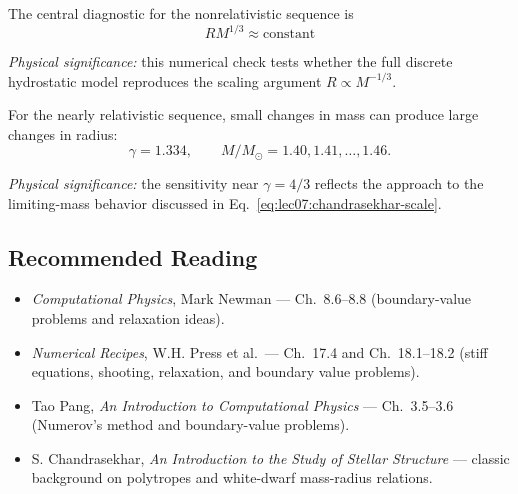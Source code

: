 The central diagnostic for the nonrelativistic sequence is
\begin{equation}
    \boxed{
    RM^{1/3}\approx \text{constant}}
    \label{eq:lec07:nonrel-diagnostic}
\end{equation}

\textit{Physical significance:} this numerical check tests whether the full
discrete hydrostatic model reproduces the scaling argument
$R\propto M^{-1/3}$.

For the nearly relativistic sequence, small changes in mass can produce
large changes in radius:
\begin{equation}
    \gamma=1.334,
    \qquad
    M/M_\odot=1.40,1.41,\ldots,1.46.
    \label{eq:lec07:near-relativistic-sequence}
\end{equation}

\textit{Physical significance:} the sensitivity near $\gamma=4/3$ reflects
the approach to the limiting-mass behavior discussed in
Eq.~\eqref{eq:lec07:chandrasekhar-scale}.

\subsection*{Recommended Reading}
\begin{itemize}
    \item \textit{Computational Physics}, Mark Newman --- Ch.\ 8.6--8.8
    (boundary-value problems and relaxation ideas).
    \item \textit{Numerical Recipes}, W.H. Press et al.\ --- Ch.\ 17.4 and
    Ch.\ 18.1--18.2 (stiff equations, shooting, relaxation, and boundary
    value problems).
    \item Tao Pang, \textit{An Introduction to Computational Physics} ---
    Ch.\ 3.5--3.6 (Numerov's method and boundary-value problems).
    \item S. Chandrasekhar, \textit{An Introduction to the Study of Stellar
    Structure} --- classic background on polytropes and white-dwarf
    mass-radius relations.
\end{itemize}
